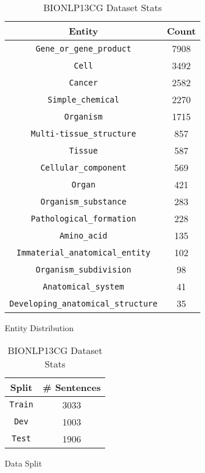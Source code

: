 \begin{table}[h!]
\begin{subtable}[t]{.48\linewidth}
\centering
\begin{tabular}{|c|c|}\hline
	\textbf{Entity} & \textbf{Count}\\\hline
	\texttt{Gene\_or\_gene\_product} & 7908\\\hline
    \texttt{Cell} & 3492\\\hline
    \texttt{Cancer} & 2582\\\hline
    \texttt{Simple\_chemical} & 2270\\\hline
    \texttt{Organism} & 1715\\\hline
    \texttt{Multi-tissue\_structure} & 857\\\hline
    \texttt{Tissue} & 587\\\hline
    \texttt{Cellular\_component} & 569\\\hline
    \texttt{Organ} & 421\\\hline
    \texttt{Organism\_substance} & 283\\\hline
    \texttt{Pathological\_formation} & 228\\\hline
    \texttt{Amino\_acid} & 135\\\hline
    \texttt{Immaterial\_anatomical\_entity} & 102\\\hline
    \texttt{Organism\_subdivision} & 98\\\hline
    \texttt{Anatomical\_system} & 41\\\hline
    \texttt{Developing\_anatomical\_structure} & 35\\\hline
	\end{tabular}
	\caption{Entity Distribution}
	\label{tab:bio_entity_distribution}
\end{subtable}
\begin{subtable}[t]{.48\linewidth}
\centering
\begin{tabular}{|c|c|}\hline
	\textbf{Split} & \textbf{\# Sentences}\\\hline
	\texttt{Train} & 3033\\\hline
	\texttt{Dev} & 1003\\\hline
	\texttt{Test} & 1906\\\hline
	\end{tabular}
	\caption{Data Split}
	\label{tab:bio_dataset_split}
\end{subtable}
\caption{BIONLP13CG Dataset Stats}
\end{table}

